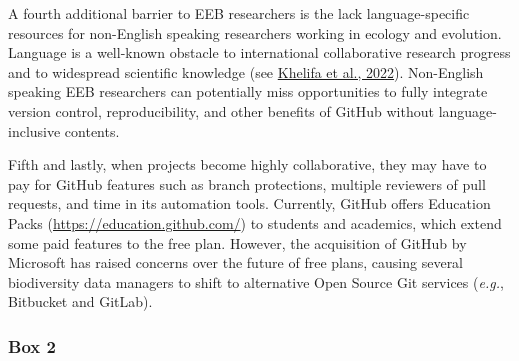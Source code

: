 A fourth additional barrier to EEB researchers is the lack language-specific resources for non-English speaking researchers working in ecology and evolution.
Language is a well-known obstacle to international collaborative research progress and to widespread scientific knowledge (see \protect\hyperlink{ref-cW7vGddM}{Khelifa et al., 2022}).
Non-English speaking EEB researchers can potentially miss opportunities to fully integrate version control, reproducibility, and other benefits of GitHub without language-inclusive contents.

Fifth and lastly, when projects become highly collaborative, they may have to pay for GitHub features such as branch protections, multiple reviewers of pull requests, and time in its automation tools.
Currently, GitHub offers Education Packs (\url{https://education.github.com/}) to students and academics, which extend some paid features to the free plan.
However, the acquisition of GitHub by Microsoft has raised concerns over the future of free plans, causing several biodiversity data managers to shift to alternative Open Source Git services (\emph{e.g.}, Bitbucket and GitLab).

\hypertarget{tips}{%
\subsubsection{Box 2}\label{tips}}

